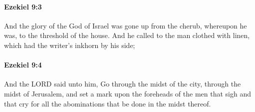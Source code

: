 		\paragraph{Ezekiel 9:3} %
			\label{EZEKIEL-9-3}

			And the glory of the God of Israel was gone up from the cherub, whereupon he was, to the threshold of the house. And he called to the man clothed with linen, which had the writer’s inkhorn by his side;


		\paragraph{Ezekiel 9:4} %
			\label{EZEKIEL-9-4}

			And the LORD said unto him, Go through the midst of the city, through the midst of Jerusalem, and set a mark upon the foreheads of the men that sigh and that cry for all the abominations that be done in the midst thereof.

